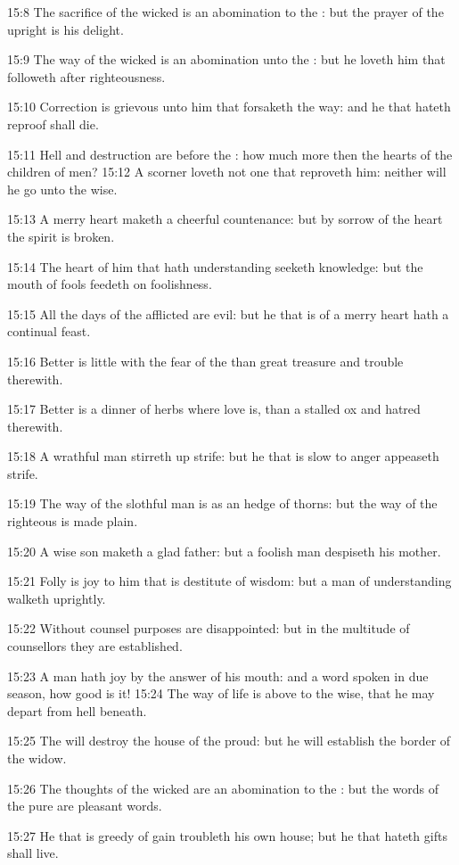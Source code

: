 15:8 The sacrifice of the wicked is an abomination to the \LORD: but
the prayer of the upright is his delight.

15:9 The way of the wicked is an abomination unto the \LORD: but he
loveth him that followeth after righteousness.

15:10 Correction is grievous unto him that forsaketh the way: and he
that hateth reproof shall die.

15:11 Hell and destruction are before the \LORD: how much more then the
hearts of the children of men?  15:12 A scorner loveth not one that
reproveth him: neither will he go unto the wise.

15:13 A merry heart maketh a cheerful countenance: but by sorrow of
the heart the spirit is broken.

15:14 The heart of him that hath understanding seeketh knowledge: but
the mouth of fools feedeth on foolishness.

15:15 All the days of the afflicted are evil: but he that is of a
merry heart hath a continual feast.

15:16 Better is little with the fear of the \LORD than great treasure
and trouble therewith.

15:17 Better is a dinner of herbs where love is, than a stalled ox and
hatred therewith.

15:18 A wrathful man stirreth up strife: but he that is slow to anger
appeaseth strife.

15:19 The way of the slothful man is as an hedge of thorns: but the
way of the righteous is made plain.

15:20 A wise son maketh a glad father: but a foolish man despiseth his
mother.

15:21 Folly is joy to him that is destitute of wisdom: but a man of
understanding walketh uprightly.

15:22 Without counsel purposes are disappointed: but in the multitude
of counsellors they are established.

15:23 A man hath joy by the answer of his mouth: and a word spoken in
due season, how good is it!  15:24 The way of life is above to the
wise, that he may depart from hell beneath.

15:25 The \LORD will destroy the house of the proud: but he will
establish the border of the widow.

15:26 The thoughts of the wicked are an abomination to the \LORD: but
the words of the pure are pleasant words.

15:27 He that is greedy of gain troubleth his own house; but he that
hateth gifts shall live.

